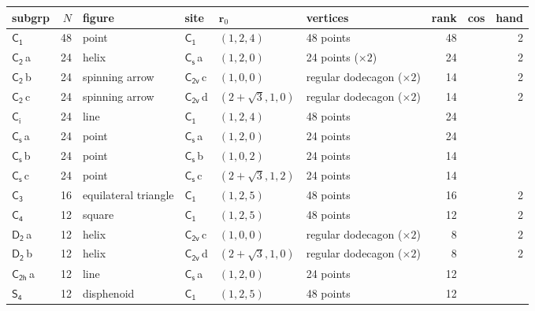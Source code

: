 \documentclass[10pt,a4paper]{article}
\numberwithin{equation}{section}
\newcommand{\grp}[1]{\mathsf{#1}}
\newcommand{\clsletter}[1]{\,{\scriptsize\color{black!55}#1}}
\newcommand{\pointr}{\mathbf{r}}
\newlength{\fillwidth}\newlength{\cellwidth}\newlength{\colwidth}
\begin{document}
{{\begin{longtable}{@{}lrllllr>{\RaggedRight\arraybackslash}p{\fillwidth}r@{}}
subgrp & $N$ & figure & site & $\pointr_0$ & vertices & rank & cos & hand\\\midrule\endhead
\bottomrule\endfoot\endlastfoot
\href{C1.pdf}{$\grp{C_{1}}$} & 48 & point & \href{C1.pdf}{$\grp{C_{1}}$} & $(1, 2, 4)$ & 48 points & 48 &  & 2\\*
\href{C2.pdf}{$\grp{C_{2}}$}\clsletter{a} & 24 & helix & \href{C1v.pdf}{$\grp{C_{s}}$}\clsletter{a} & $(1, 2, 0)$ & 24 points (${\times}2$) & 24 &  & 2\\
\href{C2.pdf}{$\grp{C_{2}}$}\clsletter{b} & 24 & spinning arrow & \href{C2v.pdf}{$\grp{C_{2v}}$}\clsletter{c} & $(1, 0, 0)$ & regular dodecagon (${\times}2$) & 14 &  & 2\\
\href{C2.pdf}{$\grp{C_{2}}$}\clsletter{c} & 24 & spinning arrow & \href{C2v.pdf}{$\grp{C_{2v}}$}\clsletter{d} & $(2 + \sqrt{3}, 1, 0)$ & regular dodecagon (${\times}2$) & 14 &  & 2\\
\href{S2.pdf}{$\grp{C_{i}}$} & 24 & line & \href{C1.pdf}{$\grp{C_{1}}$} & $(1, 2, 4)$ & 48 points & 24 &  & \\
\href{C1v.pdf}{$\grp{C_{s}}$}\clsletter{a} & 24 & point & \href{C1v.pdf}{$\grp{C_{s}}$}\clsletter{a} & $(1, 2, 0)$ & 24 points & 24 &  & \\
\href{C1v.pdf}{$\grp{C_{s}}$}\clsletter{b} & 24 & point & \href{C1v.pdf}{$\grp{C_{s}}$}\clsletter{b} & $(1, 0, 2)$ & 24 points & 14 &  & \\
\href{C1v.pdf}{$\grp{C_{s}}$}\clsletter{c} & 24 & point & \href{C1v.pdf}{$\grp{C_{s}}$}\clsletter{c} & $(2 + \sqrt{3}, 1, 2)$ & 24 points & 14 &  & \\
\href{C3.pdf}{$\grp{C_{3}}$} & 16 & equilateral triangle & \href{C1.pdf}{$\grp{C_{1}}$} & $(1, 2, 5)$ & 48 points & 16 &  & 2\\
\href{C4.pdf}{$\grp{C_{4}}$} & 12 & square & \href{C1.pdf}{$\grp{C_{1}}$} & $(1, 2, 5)$ & 48 points & 12 &  & 2\\
\href{D2.pdf}{$\grp{D_{2}}$}\clsletter{a} & 12 & helix & \href{C2v.pdf}{$\grp{C_{2v}}$}\clsletter{c} & $(1, 0, 0)$ & regular dodecagon (${\times}2$) & 8 &  & 2\\
\href{D2.pdf}{$\grp{D_{2}}$}\clsletter{b} & 12 & helix & \href{C2v.pdf}{$\grp{C_{2v}}$}\clsletter{d} & $(2 + \sqrt{3}, 1, 0)$ & regular dodecagon (${\times}2$) & 8 &  & 2\\
\href{C2h.pdf}{$\grp{C_{2h}}$}\clsletter{a} & 12 & line & \href{C1v.pdf}{$\grp{C_{s}}$}\clsletter{a} & $(1, 2, 0)$ & 24 points & 12 &  & \\
\href{S4.pdf}{$\grp{S_{4}}$} & 12 & disphenoid & \href{C1.pdf}{$\grp{C_{1}}$} & $(1, 2, 5)$ & 48 points & 12 &  & \\

\end{longtable}}}
\end{document}

